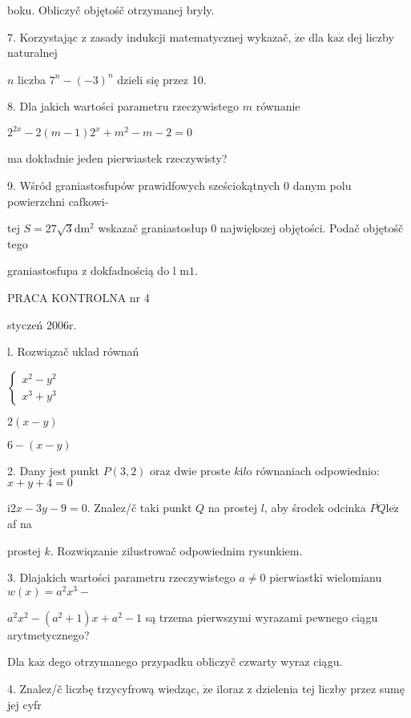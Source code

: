\documentclass[a4paper,12pt]{article}
\begin{document}
boku. Obliczyč objętośč otrzymanej bryly.

7. Korzystając $\mathrm{z}$ zasady indukcji matematycznej wykazač, $\dot{\mathrm{z}}\mathrm{e}$ dla $\mathrm{k}\mathrm{a}\dot{\mathrm{z}}$ dej liczby naturalnej

$n$ liczba $7^{n}-(-3)^{n}$ dzieli się przez 10.

8. Dla jakich wartości parametru rzeczywistego $m$ równanie

$2^{2x}-2(m-1)2^{x}+m^{2}-m-2=0$

ma dokładnie jeden pierwiastek rzeczywisty?

9. Wśród graniastosfupów prawidfowych sześciokątnych $0$ danym polu powierzchni cafkowi-

tej $S=27\sqrt{3}\mathrm{d}\mathrm{m}^{2}$ wskazač graniastosłup $0$ największej objętości. Podač objętośč tego

graniastosfupa $\mathrm{z}$ dokfadnością do l $\mathrm{m}1.$





PRACA KONTROLNA nr 4

styczeń 2006r.

l. Rozwiązač uklad równań

$\left\{\begin{array}{l}
x^{2}-y^{2}\\
x^{3}+y^{3}
\end{array}\right.$

$2(x-y)$

$6-(x-y)$

2. Dany jest punkt $P(3,2)$ oraz dwie proste $k\mathrm{i}l\mathrm{o}$ równaniach odpowiednio: $x+y+4=0$

$\mathrm{i}2x-3y-9=0$. Znalez/č taki punkt $Q$ na prostej $l$, aby środek odcinka $\overline{PQ}\mathrm{l}\mathrm{e}\dot{\mathrm{z}}$ af na

prostej $k$. Rozwiqzanie zilustrowač odpowiednim rysunkiem.

3. Dlajakich wartości parametru rzeczywistego $a\neq 0$ pierwiastki wielomianu $w(x)=a^{2}x^{3}-$

$a^{2}x^{2}-(a^{2}+1)x+a^{2}-1$ są trzema pierwszymi wyrazami pewnego ciągu arytmetycznego?

Dla $\mathrm{k}\mathrm{a}\dot{\mathrm{z}}$ dego otrzymanego przypadku obliczyč czwarty wyraz ciągu.

4. Znalez/č liczbę trzycyfrową wiedząc, $\dot{\mathrm{z}}\mathrm{e}$ iloraz $\mathrm{z}$ dzielenia tej liczby przez sumę jej cyfr
\end{document}
